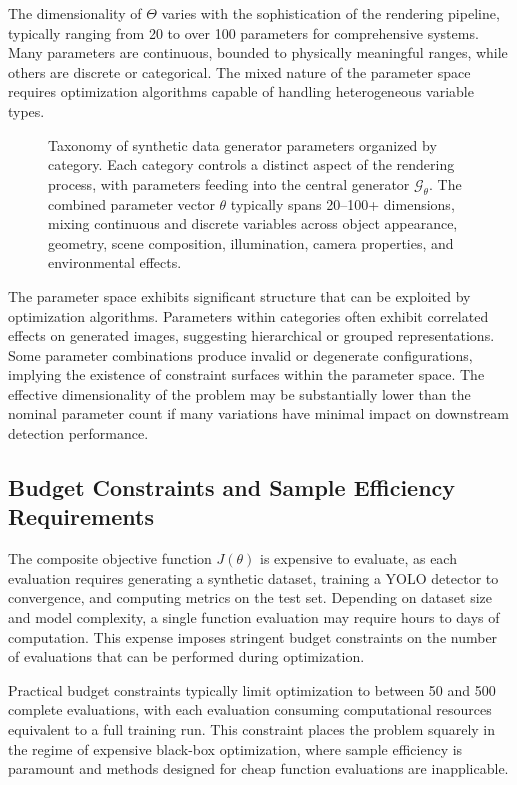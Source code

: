 The dimensionality of $\Theta$ varies with the sophistication of the rendering pipeline, typically ranging from 20 to over 100 parameters for comprehensive systems. Many parameters are continuous, bounded to physically meaningful ranges, while others are discrete or categorical. The mixed nature of the parameter space requires optimization algorithms capable of handling heterogeneous variable types.

\begin{figure}[t]
\centering
\resizebox{0.85\textwidth}{!}{}
\caption{Taxonomy of synthetic data generator parameters organized by category. Each category controls a distinct aspect of the rendering process, with parameters feeding into the central generator $\mathcal{G}_\theta$. The combined parameter vector $\theta$ typically spans 20--100+ dimensions, mixing continuous and discrete variables across object appearance, geometry, scene composition, illumination, camera properties, and environmental effects.}
\label{fig:parameter_space}
\end{figure}

The parameter space exhibits significant structure that can be exploited by optimization algorithms. Parameters within categories often exhibit correlated effects on generated images, suggesting hierarchical or grouped representations. Some parameter combinations produce invalid or degenerate configurations, implying the existence of constraint surfaces within the parameter space. The effective dimensionality of the problem may be substantially lower than the nominal parameter count if many variations have minimal impact on downstream detection performance.

\subsection{Budget Constraints and Sample Efficiency Requirements}
\label{subsec:budget_constraints}

The composite objective function $J(\theta)$ is expensive to evaluate, as each evaluation requires generating a synthetic dataset, training a YOLO detector to convergence, and computing metrics on the test set. Depending on dataset size and model complexity, a single function evaluation may require hours to days of computation. This expense imposes stringent budget constraints on the number of evaluations that can be performed during optimization.

Practical budget constraints typically limit optimization to between 50 and 500 complete evaluations, with each evaluation consuming computational resources equivalent to a full training run. This constraint places the problem squarely in the regime of expensive black-box optimization, where sample efficiency is paramount and methods designed for cheap function evaluations are inapplicable.

